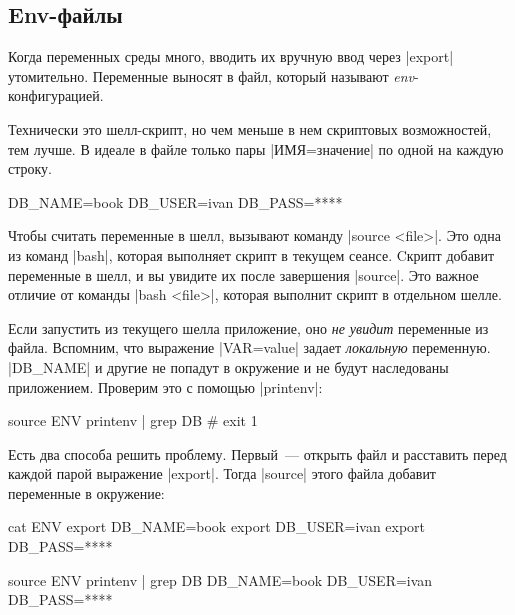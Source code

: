
\subsection{Env-файлы}

Когда переменных среды много, вводить их вручную ввод через \spverb|export|
утомительно. Переменные выносят в файл, который называют
\emph{env}-конфигурацией.

Технически это шелл-скрипт, но чем меньше в нем скриптовых возможностей, тем
лучше. В идеале в файле только пары \spverb|ИМЯ=значение| по одной на каждую
строку.

\begin{english}
  \begin{bash}
DB_NAME=book
DB_USER=ivan
DB_PASS=****
  \end{bash}
\end{english}

Чтобы считать переменные в шелл, вызывают команду \spverb|source <file>|. Это
одна из команд \spverb|bash|, которая выполняет скрипт в текущем сеансе. Cкрипт
добавит переменные в шелл, и вы увидите их после завершения \spverb|source|. Это
важное отличие от команды \spverb|bash <file>|, которая выполнит скрипт в
отдельном шелле.

\begin{english}
\end{english}

Если запустить из текущего шелла приложение, оно \emph{не увидит} переменные из
файла. Вспомним, что выражение \spverb|VAR=value| задает \emph{локальную}
переменную. \spverb|DB_NAME| и другие не попадут в окружение и не будут
наследованы приложением. Проверим это с помощью \spverb|printenv|:

\begin{english}
  \begin{bash}
source ENV
printenv | grep DB
# exit 1
  \end{bash}
\end{english}

Есть два способа решить проблему. Первый~--- открыть файл и расставить перед
каждой парой выражение \spverb|export|. Тогда \spverb|source| этого файла
добавит переменные в окружение:

\begin{english}
  \begin{bash}
cat ENV
export DB_NAME=book
export DB_USER=ivan
export DB_PASS=****

source ENV
printenv | grep DB
DB_NAME=book
DB_USER=ivan
DB_PASS=****
  \end{bash}
\end{english}

